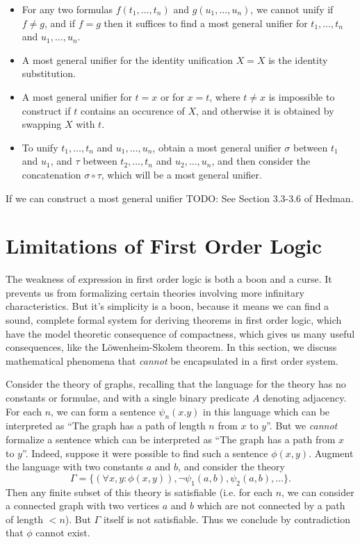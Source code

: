%
\begin{itemize}
    \item For any two formulas $f(t_1, \dots, t_n)$ and $g(u_1, \dots, u_n)$, we cannot unify if $f \neq g$, and if $f = g$ then it suffices to find a most general unifier for $t_1, \dots, t_n$ and $u_1, \dots, u_n$.
    \item A most general unifier for the identity unification $X = X$ is the identity substitution.
    \item A most general unifier for $t = x$ or for $x = t$, where $t \neq x$ is impossible to construct if $t$ contains an occurence of $X$, and otherwise it is obtained by swapping $X$ with $t$.
    \item To unify $t_1, \dots, t_n$ and $u_1, \dots, u_n$, obtain a most general unifier $\sigma$ between $t_1$ and $u_1$, and $\tau$ between $t_2, \dots, t_n$ and $u_2, \dots, u_n$, and then consider the concatenation $\sigma \circ \tau$, which will be a most general unifier.
\end{itemize}
%
If we can construct a most general unifier TODO: See Section 3.3-3.6 of Hedman.




\section{Limitations of First Order Logic}

The weakness of expression in first order logic is both a boon and a curse. It prevents us from formalizing certain theories involving more infinitary characteristics. But it's simplicity is a boon, because it means we can find a sound, complete formal system for deriving theorems in first order logic, which have the model theoretic consequence of compactness, which gives us many useful consequences, like the L\"{o}wenheim-Skolem theorem. In this section, we discuss mathematical phenomena that \emph{cannot} be encapsulated in a first order system.

\begin{example}
    Consider the theory of graphs, recalling that the language for the theory has no constants or formulae, and with a single binary predicate $A$ denoting adjacency. For each $n$, we can form a sentence $\psi_n(x.y)$ in this language which can be interpreted as ``The graph has a path of length $n$ from $x$ to $y$''. But we \emph{cannot} formalize a sentence which can be interpreted as ``The graph has a path from $x$ to $y$''. Indeed, suppose it were possible to find such a sentence $\phi(x,y)$. Augment the language with two constants $a$ and $b$, and consider the theory
    \[ \Gamma = \{ (\forall x,y: \phi(x,y)), \neg \psi_1(a,b), \psi_2(a,b), \dots \}. \]
    Then any finite subset of this theory is satisfiable (i.e. for each $n$, we can consider a connected graph with two vertices $a$ and $b$ which are not connected by a path of length $< n$). But $\Gamma$ itself is not satisfiable. Thus we conclude by contradiction that $\phi$ cannot exist.
\end{example}

